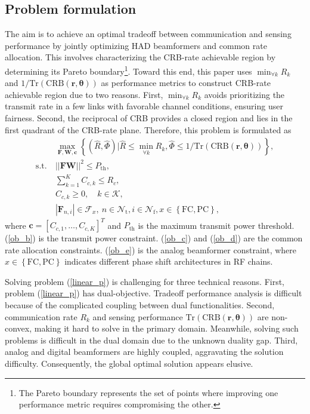 \documentclass[10pt,journal,twocolumn]{IEEEtran}
\begin{document}
\subsection{Problem formulation}
The aim is to achieve  an optimal tradeoff between communication and sensing performance by jointly optimizing HAD beamformers and common rate allocation. This involves characterizing the CRB-rate achievable region by determining its Pareto boundary\footnote{The Pareto boundary represents the set of points where improving one performance metric requires compromising the other.}. Toward this end, this paper uses 
$\min_{\forall k}R_k$ and $1/\text{Tr}\left(\text{CRB}\left(\mathbf{r},\bm{\theta}\right)\right)$ as performance metrics to construct CRB-rate achievable region due to two reasons. First, $\min_{\forall k}R_k$ avoids prioritizing the transmit rate in a few links with favorable channel conditions, ensuring user fairness. Second, the reciprocal of CRB provides a closed region and lies in the first quadrant of the CRB-rate plane. Therefore, this problem is formulated as
\begin{subequations}\label{linear_p}
	\begin{align}
&\max_{\mathbf{F},\mathbf{W},\mathbf{c} } \left\{\left(\hat{R},\hat{\Phi}\right) \Big|\hat{R}\leq\min_{\forall k}R_k, \hat{\Phi}\leq  1/\text{Tr}\left(\text{CRB}\left(\mathbf{r},\bm{\theta}\right)\right)\right\},\label{ob_a}\\
	\text{s.t.}~
	&||\mathbf{F}\mathbf{W}||^2\leq P_{\text{th}},\label{ob_b}\\
 &\sum_{k=1}^{K}C_{c,k} \leq R_c,\label{ob_c}\\
 &C_{c,k} \geq 0, \quad k\in\mathcal{K},\label{ob_d}\\
  &|\mathbf{F}_{n,i}|\in\mathcal{F}_{x},~ n\in\mathcal{N}_{\text{t}},i\in\mathcal{N}_{\text{f}}, x\in\left\{\text{FC},\text{PC}\right\},\label{ob_e} 
	\end{align}
\end{subequations}
where $\mathbf{c}=\left[C_{c,1},\dots, C_{c,K}\right]^T$ and $P_{\text{th}}$ is the maximum transmit power threshold. (\ref{ob_b}) is the transmit power constraint.  (\ref{ob_c}) and (\ref{ob_d}) are the common rate allocation constraints. (\ref{ob_e}) is the analog beamformer constraint, where $x\in\left\{\text{FC},\text{PC}\right\}$ indicates different phase shift architectures in RF chains. 

Solving problem (\ref{linear_p}) is challenging for three technical reasons. First, problem (\ref{linear_p}) has dual-objective. Tradeoff performance analysis is difficult because of the complicated coupling between dual functionalities. Second, communication rate $R_k$ and sensing performance $\text{Tr}\left(\text{CRB}\left(\mathbf{r},\bm{\theta}\right)\right)$ are non-convex, making it hard to solve in the primary domain. Meanwhile, solving such problems is difficult in the dual domain due to the unknown duality gap. Third, analog and digital beamformers are highly coupled, aggravating the solution difficulty. Consequently, the global optimal solution appears elusive.
\end{document}
